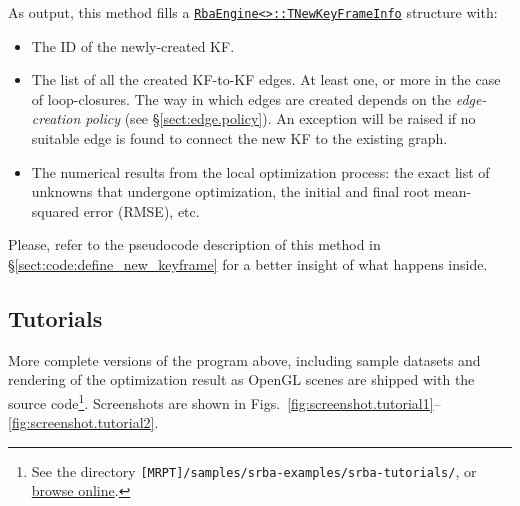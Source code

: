 \documentclass[a4paper,11pt]{article}
\begin{document}
As output, this method fills a 
\href{http://reference.mrpt.org/svn/structmrpt_1_1srba_1_1_rba_engine_1_1_t_new_key_frame_info.html}
{\texttt{RbaEngine<>::TNewKeyFrameInfo}} 
structure with:
\begin{itemize}
 \item The ID of the newly-created KF. 
 \item{ The list of all the created KF-to-KF edges. At least one, or more in the case of loop-closures. 
        The way in which edges are created depends on the \emph{edge-creation policy} (see \S\ref{sect:edge.policy}).
        An exception will be raised if no suitable edge is found to connect the new KF to the existing graph.}
 \item The numerical results from the local optimization process: the exact list of unknowns that undergone optimization, 
       the initial and final root mean-squared error (RMSE), etc.
\end{itemize}

Please, refer to the pseudocode description of this method 
in \S\ref{sect:code:define_new_keyframe} for a better insight of 
what happens inside.


\newpage

\subsection{Tutorials}

More complete versions of the program above, including sample datasets and rendering of the optimization result 
as OpenGL scenes are shipped with the source code\footnote{See the directory \texttt{[MRPT]/samples/srba-examples/srba-tutorials/}, 
or \href{http://mrpt.googlecode.com/svn/trunk/samples/srba-examples/srba-tutorials/}{browse online}.}.
Screenshots are shown in Figs.~\ref{fig:screenshot.tutorial1}--\ref{fig:screenshot.tutorial2}.
\end{document}
